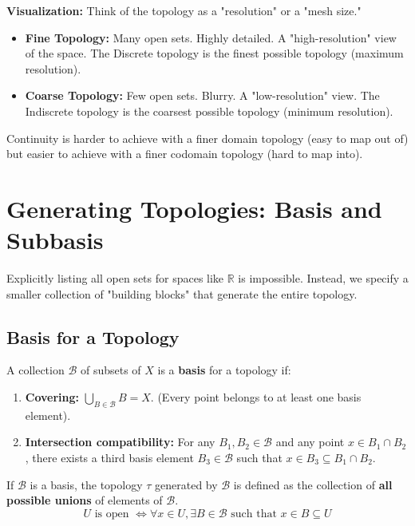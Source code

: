 \documentclass[oneside]{book}
\begin{document}
\textbf{Visualization:} Think of the topology as a "resolution" or a "mesh size."
\begin{itemize}
    \item \textbf{Fine Topology:} Many open sets. Highly detailed. A "high-resolution" view of the space. The Discrete topology is the finest possible topology (maximum resolution).
    \item \textbf{Coarse Topology:} Few open sets. Blurry. A "low-resolution" view. The Indiscrete topology is the coarsest possible topology (minimum resolution).
\end{itemize}
Continuity is harder to achieve with a finer domain topology (easy to map out of) but easier to achieve with a finer codomain topology (hard to map into).

\section{Generating Topologies: Basis and Subbasis}

Explicitly listing all open sets for spaces like $\mathbb{R}$ is impossible. Instead, we specify a smaller collection of "building blocks" that generate the entire topology.

\subsection{Basis for a Topology}

\begin{definition}[Basis]
A collection $\mathcal{B}$ of subsets of $X$ is a \textbf{basis} for a topology if:
\begin{enumerate}
    \item \textbf{Covering:} $\bigcup_{B \in \mathcal{B}} B = X$. (Every point belongs to at least one basis element).
    \item \textbf{Intersection compatibility:} For any $B_1, B_2 \in \mathcal{B}$ and any point $x \in B_1 \cap B_2$, there exists a third basis element $B_3 \in \mathcal{B}$ such that $x \in B_3 \subseteq B_1 \cap B_2$.
\end{enumerate}
\end{definition}

If $\mathcal{B}$ is a basis, the topology $\tau$ generated by $\mathcal{B}$ is defined as the collection of \textbf{all possible unions} of elements of $\mathcal{B}$.
\[ U \text{ is open } \iff \forall x \in U, \exists B \in \mathcal{B} \text{ such that } x \in B \subseteq U \]
\end{document}
